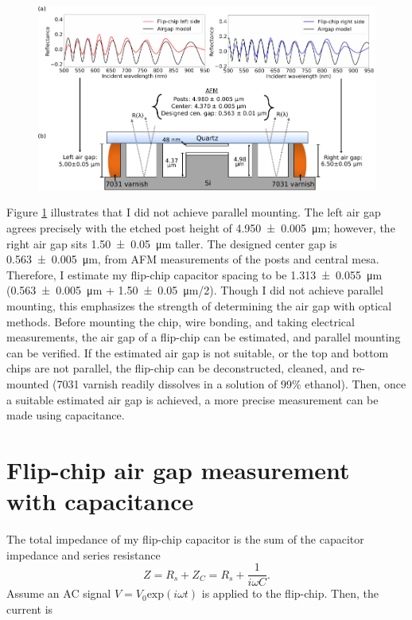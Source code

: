 \documentclass[double,12pt,1in]{beavtex}
\begin{document}
\begin{figure}
    \includegraphics[width = 1\textwidth]{Flip-chip capacitor reflectance summary.pdf}
    \caption{}
    \label{FCCap Ref Summ}
\end{figure}
Figure \ref{FCCap Ref Summ} illustrates that I did not achieve parallel mounting. The left air gap agrees precisely with the etched post height of \SI{4.950(5)}{\micro\meter}; however, the right air gap sits \SI{1.50(5)}{\micro\meter} taller. The designed center gap is \SI{0.563(5)}{\micro\meter}, from AFM measurements of the posts and central mesa. Therefore, I estimate my flip-chip capacitor spacing to be \SI{1.313(55)}{\micro\meter} (\SI{0.563(5)}{\micro\meter} + \SI{1.50(5)}{\micro\meter}/2). Though I did not achieve parallel mounting, this emphasizes the strength of determining the air gap with optical methods. Before mounting the chip, wire bonding, and taking electrical measurements, the air gap of a flip-chip can be estimated, and parallel mounting can be verified. If the estimated air gap is not suitable, or the top and bottom chips are not parallel, the flip-chip can be deconstructed, cleaned, and re-mounted (7031 varnish readily dissolves in a solution of 99\% ethanol). Then, once a suitable estimated air gap is achieved, a more precise measurement can be made using capacitance.


\section{Flip-chip air gap measurement with capacitance}
The total impedance of my flip-chip capacitor is the sum of the capacitor impedance and series resistance
\begin{equation}
    Z = R_s + Z_C = R_s + \frac{1}{i\omega C}.
\end{equation}
Assume an AC signal $V = V_0 \mathrm{exp}(i\omega t)$ is applied to the flip-chip. Then, the current is 
\end{document}
